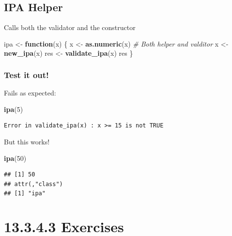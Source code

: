 \documentclass[]{book}
\newenvironment{Shaded}{\begin{snugshade}}{\end{snugshade}}
\newcommand{\CommentTok}[1]{\textcolor[rgb]{0.56,0.35,0.01}{\textit{#1}}}
\newcommand{\ControlFlowTok}[1]{\textcolor[rgb]{0.13,0.29,0.53}{\textbf{#1}}}
\newcommand{\DecValTok}[1]{\textcolor[rgb]{0.00,0.00,0.81}{#1}}
\newcommand{\KeywordTok}[1]{\textcolor[rgb]{0.13,0.29,0.53}{\textbf{#1}}}
\newcommand{\NormalTok}[1]{#1}
\newcommand{\StringTok}[1]{\textcolor[rgb]{0.31,0.60,0.02}{#1}}
\begin{document}
\hypertarget{ipa-helper}{%
\subsection*{IPA Helper}\label{ipa-helper}}

Calls both the validator and the constructor

\begin{Shaded}
\begin{Highlighting}[]
\NormalTok{ipa <-}\StringTok{ }\ControlFlowTok{function}\NormalTok{(x) \{}
\NormalTok{  x <-}\StringTok{ }\KeywordTok{as.numeric}\NormalTok{(x)}
  \CommentTok{# Both helper and valditor}
\NormalTok{  x <-}\StringTok{ }\KeywordTok{new_ipa}\NormalTok{(x)}
\NormalTok{  res <-}\StringTok{ }\KeywordTok{validate_ipa}\NormalTok{(x)}
\NormalTok{  res}
\NormalTok{\}}
\end{Highlighting}
\end{Shaded}

\hypertarget{test-it-out}{%
\subsubsection{Test it out!}\label{test-it-out}}

Fails as expected:

\begin{Shaded}
\begin{Highlighting}[]
\KeywordTok{ipa}\NormalTok{(}\DecValTok{5}\NormalTok{)}
\end{Highlighting}
\end{Shaded}

\begin{verbatim}
Error in validate_ipa(x) : x >= 15 is not TRUE
\end{verbatim}

But this works!

\begin{Shaded}
\begin{Highlighting}[]
\KeywordTok{ipa}\NormalTok{(}\DecValTok{50}\NormalTok{)}
\end{Highlighting}
\end{Shaded}

\begin{verbatim}
## [1] 50
## attr(,"class")
## [1] "ipa"
\end{verbatim}

\hypertarget{exercises-10}{%
\section*{13.3.4.3 Exercises}\label{exercises-10}}
\end{document}
